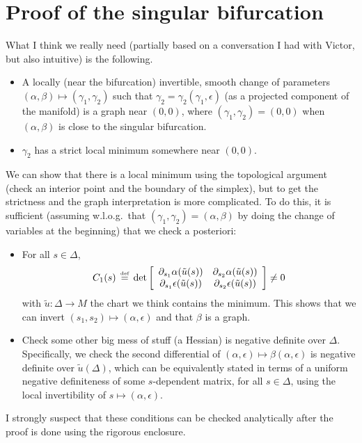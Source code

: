 \documentclass[10pt]{article}
\newcommand{\bydef}{\,\stackrel{\mbox{\tiny\textnormal{\raisebox{0ex}[0ex][0ex]{def}}}}{=}\,}
\begin{document}
\section{Proof of the singular bifurcation}
What I think we really need (partially based on a conversation I had with Victor, but also intuitive) is the following.
\begin{itemize}
\item A locally (near the bifurcation) invertible, smooth change of parameters $(\alpha,\beta)\mapsto(\gamma_1,\gamma_2)$ such that $\gamma_2=\gamma_2(\gamma_1,\epsilon)$ (as a projected component of the manifold) is a graph near $(0,0)$, where $(\gamma_1,\gamma_2)=(0,0)$ when $(\alpha,\beta)$ is close to the singular bifurcation.
\item $\gamma_2$ has a strict local minimum somewhere near $(0,0)$.
\end{itemize}
We can show that there is a local minimum using the topological argument (check an interior point and the boundary of the simplex), but to get the strictness and the graph interpretation is more complicated. To do this, it is sufficient (assuming w.l.o.g.\ that $(\gamma_1,\gamma_2)=(\alpha,\beta)$ by doing the change of variables at the beginning) that we check a posteriori:
\begin{itemize}
\item For all $s\in\Delta$, $$C_1(s)\bydef\det\left[\begin{array}{cc}\partial_{s_1}\alpha (\tilde u(s)) & \partial_{s_2}\alpha(\tilde u(s)) \\ \partial_{s_1}\epsilon (\tilde u(s)) & \partial_{s_2}\epsilon(\tilde u(s)) \end{array}\right]\neq 0$$with $\tilde u:\Delta\rightarrow M$ the chart we think contains the minimum. This shows that we can invert $(s_1,s_2)\mapsto(\alpha,\epsilon)$ and that $\beta$ is a graph.
\item Check some other big mess of stuff (a Hessian) is negative definite over $\Delta$. Specifically, we check the second differential of $(\alpha,\epsilon)\mapsto\beta(\alpha,\epsilon)$ is negative definite over $\tilde u(\Delta)$, which can be equivalently stated in terms of a uniform negative definiteness of some $s$-dependent matrix, for all $s\in\Delta$, using the local invertibility of $s\mapsto(\alpha,\epsilon)$.
\end{itemize}
I strongly suspect that these conditions can be checked analytically after the proof is done using the rigorous enclosure.
\end{document}
